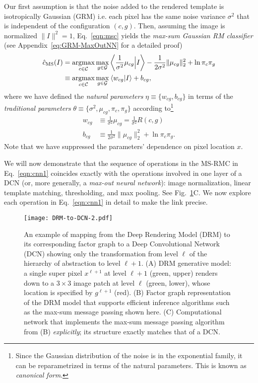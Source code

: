 \documentclass[12pt]{article}
\DeclareMathOperator*{\argmax}{argmax}
\newcommand{\Cl}[0]{{ \mathcal{C} }}
\newcommand{\G}[0]{{ \mathcal{G} }}
\begin{document}
Our first assumption is that the noise added to the rendered template is isotropically Gaussian (GRM) i.e. each pixel has the same noise variance $\sigma^{2}$ that is independent of the configuration $(c,g)$.
Then, assuming the image is normalized $\| I \|^{2}=1$, Eq.~\ref{eqn:msc} yields the {\em max-sum Gaussian RM classifier} (see Appendix~\ref{eq:GRM-MaxOutNN} for a detailed proof)
\begin{align} 
        \label{eqn:cnn1}
\hat{c}_{\rm MS}(I) &= 
\argmax_{c \in \Cl} \max_{g\in \G} \left\langle \frac{1}{\sigma^2} \mu_{cg} \Big| I \right\rangle 
- \frac{1}{2\sigma^2} \|  \mu_{cg}\|_2^2 + \ln\pi_{c}\pi_{g}  \nonumber\\
	&\equiv  \argmax_{c \in \Cl} \max_{g\in \G} \: \langle w_{cg} | I\rangle + b_{cg} ,
\end{align}
where we have defined the \emph{natural parameters} $\eta \equiv \{ w_{cg}, b_{cg} \}$ in terms of the \emph{traditional parameters} $\theta \equiv \{\sigma^2,\mu_{cg}, \pi_c, \pi_g \}$ according to\footnote{Since the Gaussian distribution of the noise is in the exponential family, it can be reparametrized in terms of the natural parameters. This is known as {\em canonical form}.}
\begin{align} 
   w_{cg} &\equiv \frac{1}{\sigma^2} \mu_{cg} = \frac{1}{\sigma^2} R(c,g) \nonumber\\
   b_{cg} &\equiv \frac{1}{2\sigma^2} \|  \mu_{cg}\|_2^2 + \ln\pi_{c}\pi_{g}.
   \label{eqn:grm-weights-biases}
\end{align}
Note that we have suppressed the parameters' dependence on pixel location $x$. 



We will now demonstrate that the sequence of operations in the MS-RMC in Eq.~\ref{eqn:cnn1} coincides exactly with the operations involved in one layer of a DCN (or, more generally, a \emph{max-out neural network}\cite{goodfellow2013maxout}): image normalization, linear template matching, thresholding, and max pooling. See Fig.~\ref{fig:DRM-to-DCN}C.  We now explore each operation in Eq.~\ref{eqn:cnn1} in detail to make the link precise.

\begin{figure}
   \centering
   \texttt{[image: DRM-to-DCN-2.pdf]} 
   \caption{An example of mapping from the Deep Rendering Model (DRM) to its corresponding factor graph to a Deep Convolutional Network (DCN) showing only the transformation from level $\ell$ of the hierarchy of abstraction to level $\ell+1$.   
   (A) DRM generative model: a single super pixel $x^{\ell+1}$ at level $\ell + 1$ (green, upper) renders down to a $3\times 3$ image patch at level $\ell$ (green, lower), whose location is specified by $g^{\ell+1}$ (red). (B) Factor graph representation of the DRM model that supports efficient inference algorithms such as the max-sum message passing shown here. (C) Computational network that implements the max-sum message passing algorithm from (B) \emph{explicitly}; its structure exactly matches that of a DCN.}
   \label{fig:DRM-to-DCN}
\end{figure}
\end{document}
